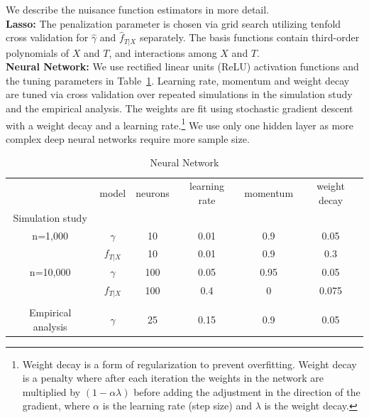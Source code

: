\documentclass[lettersize, 12pt]{article}
\begin{document}
{We describe the nuisance function estimators in more detail. \\[3pt]
\textbf{Lasso:}
The penalization parameter is chosen via grid search utilizing tenfold cross validation for $\hat\gamma$ and $\hat f_{T|X}$ separately.
The basis functions contain third-order polynomials of $X$ and $T$, and interactions among $X$ and $T$.\\[3pt]
\textbf{Neural Network:} 
We use rectified linear units (ReLU) activation functions and the tuning parameters in Table~\ref{TNN}.
Learning rate, momentum and weight decay are tuned via cross validation over repeated simulations in the simulation study and the empirical analysis. 
The weights are fit using stochastic gradient descent with a weight decay and a learning rate.\footnote{
Weight decay is a form of regularization to prevent overfitting.
Weight decay is a penalty where after each iteration the weights in the network are multiplied by $(1-\alpha\lambda)$ before adding the adjustment in the direction of the gradient, where $\alpha$ is the learning rate (step size) and $\lambda$ is the weight decay.  }
We use only one hidden layer as more complex deep neural networks require more sample size.
\begin{table}[h]
        \caption{\label{TNN} Neural Network}
        \begin{center}
         \begin{tabular*}{\textwidth}{@{}cccccc@{}}
                   \hline\hline
&model &neurons &learning rate &momentum  &weight decay  \\
Simulation study &&&&\\
n=1,000 &$\gamma$ &10 &0.01&0.9 &0.05\\
&$f_{T|X}$ &10 &0.01&0.9 &0.3
\\[3pt]
n=10,000 &$\gamma$ &100 &0.05&0.95 &0.05\\
&$f_{T|X}$ &100 &0.4 &0 &0.075\\[3pt]
\hline
\\[-5pt]
Empirical analysis &$\gamma$ &25 &0.15&0.9 &0.05\\

\end{tabular*}
\end{center}
\end{table}}
\end{document}
